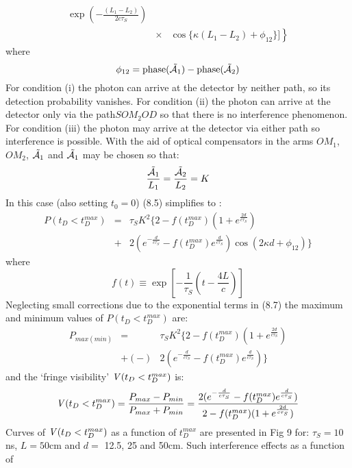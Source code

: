 {\begin{eqnarray}
     \exp \left( -\frac{(L_1-L_2)}{2 c \tau_S}\right)
 \nonumber \\
 &\times & \left. \cos\{\kappa (L_1-L_2)+\phi_{12}\} ] \right\}
  \end{eqnarray}
    where
  \[ \phi_{12} = {\rm phase}(\tilde{{\cal A}_1}) - {\rm phase}(\tilde{{\cal A}_2}) \]
    For condition (i) the photon can arrive at the detector by neither path, so its detection
    probability vanishes. For condition (ii) the photon can arrive at the detector only
     via the path$SOM_2OD$ so that there is no interference phenomenon. For condition (iii) the photon
    may arrive at the detector via either path so interference is possible. 
    With the aid of optical compensators in the arms $OM_1$, $OM_2$, $\tilde{{\cal A}_1}$ and 
     $\tilde{{\cal A}_1}$ may be chosen so that:
    \begin{equation}
     \frac{\tilde{{\cal A}_1}}{L_1} =  \frac{\tilde{{\cal A}_2}}{L_2} = K
    \end{equation}
    In this case (also setting $t_0= 0$) (8.5) simplifies to :
    \begin{eqnarray}
     P(t_D < t_D^{max}) & = & \tau_S K^2\{ 2-f(t_D^{max})(1+ e^{\frac{2d}{c \tau_S}}) \nonumber \\
        & + & 2(e^{-\frac{d}{c \tau_S}}-f(t_D^{max})e^{\frac{d}{c \tau_S}})\cos(2 \kappa d + \phi_{12})\}
    \end{eqnarray}
     where 
  \[   f(t) \equiv \exp\left[ -\frac{1}{\tau_S}(t-\frac{4 L}{c}) \right] \]
    Neglecting small corrections due to the exponential terms in (8.7)  the maximum and minimum values of 
    $P(t_D < t_D^{max})$ are:
    \begin{eqnarray}
       P_{max(min)} & = & \tau_S K^2\{ 2-f(t_D^{max})(1+ e^{\frac{2d}{c \tau_S}}) \nonumber \\
        & +(-) &2( e^{-\frac{d}{c \tau_S}}-f(t_D^{max})e^{\frac{d}{c \tau_S}})\}
    \end{eqnarray}
     and the `fringe visibility' ${\it V}(t_D < t_D^{max})$ is:
     \begin{equation} 
  {\it V}(t_D < t_D^{max}) = \frac{ P_{max}- P_{min}}{ P_{max}+ P_{min}}
       = \frac{2( e^{-\frac{d}{c \tau_S}}-f(t_D^{max})e^{\frac{d}{c \tau_S}}) }
   {2-f(t_D^{max})(1+ e^{\frac{2d}{c \tau_S}})}
    \end{equation}
    Curves of ${\it V}(t_D < t_D^{max})$ as a function of $ t_D^{max}$ are presented in Fig 9 for:
    $\tau_S = 10$ns, $L = 50$cm and $d=$ 12.5, 25 and 50cm. Such interference effects as a function of
}
